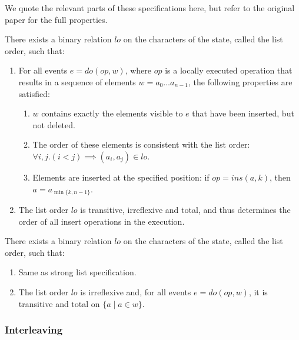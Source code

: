 \documentclass[sigplan,10pt,review,anonymous]{acmart}
\begin{document}
We quote the relevant parts of these specifications here, but refer to the original paper \cite{Attiya2016}
for the full properties.



\begin{property}\label{prop:stronglist}
  There exists a binary relation $lo$ on the characters of the state, called the list order, such that:
  \begin{enumerate}
    \item
      For all events $e = do(op, w)$, where $op$ is a locally executed operation that results in a sequence of elements $w = a_0 \dots a_{n-1}$, the following properties are satisfied:
      \begin{enumerate}
        \item
          $w$ contains exactly the elements visible to $e$ that have been inserted, but not deleted.
        \item
          The order of these elements is consistent with the list order:
          $\forall i,j. (i < j) \implies (a_i, a_j) \in lo$.
        \item
          Elements are inserted at the specified position: if $op = ins(a, k)$, then $a = a_{\min\{k, n-1\}}$.
      \end{enumerate}
    \item
      The list order $lo$ is transitive, irreflexive and total, and thus determines the order of all insert operations in the execution.
  \end{enumerate}
\end{property}


\begin{property}
  There exists a binary relation $lo$ on the characters of the state, called the list order, such that:
  \begin{enumerate}
    \item
      Same as strong list specification.
    \item
      The list order $lo$ is irreflexive and, for all events $e = do(op, w)$, it is transitive and total on $\{a \mid a \in w \}$.
  \end{enumerate}
\end{property}

\subsubsection{Interleaving}
\end{document}
